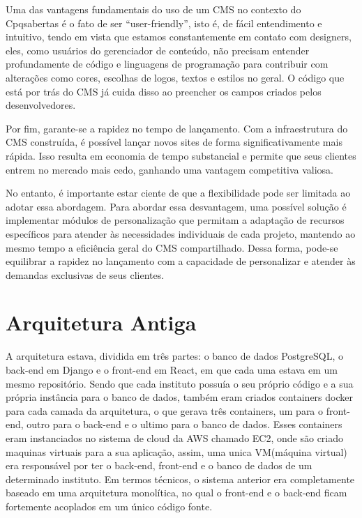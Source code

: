 \documentclass[12pt,twoside,english,brazilian]{article}
\begin{document}
Uma das vantagens fundamentais do uso de um CMS no contexto do Cpqsabertas é o fato de ser “user-friendly”, isto é, de fácil entendimento e intuitivo, tendo em vista que estamos constantemente em contato com designers, eles, como usuários do gerenciador de conteúdo, não precisam entender profundamente de código e linguagens de programação para contribuir com alterações como cores, escolhas de logos, textos e estilos no geral. O código que está por trás do CMS já cuida disso ao preencher os campos criados pelos desenvolvedores.

Por fim, garante-se a rapidez no tempo de lançamento. Com a infraestrutura do CMS construída, é possível lançar novos sites de forma significativamente mais rápida. Isso resulta em economia de tempo substancial e permite que seus clientes entrem no mercado mais cedo, ganhando uma vantagem competitiva valiosa. 

No entanto, é importante estar ciente de que a flexibilidade pode ser limitada ao adotar essa abordagem. Para abordar essa desvantagem, uma possível solução é implementar módulos de personalização que permitam a adaptação de recursos específicos para atender às necessidades individuais de cada projeto, mantendo ao mesmo tempo a eficiência geral do CMS compartilhado. Dessa forma, pode-se equilibrar a rapidez no lançamento com a capacidade de personalizar e atender às demandas exclusivas de seus clientes.

\section{Arquitetura Antiga}

A arquitetura estava, dividida em três partes: o banco de dados PostgreSQL, o back-end em Django e o front-end em React, em que cada uma estava em um mesmo repositório. Sendo que cada instituto possuía o seu próprio código e a sua própria instância para o banco de dados, também eram criados containers docker para cada camada da arquitetura, o que gerava três containers, um para o front-end, outro para o back-end e o ultimo para o banco de dados. Esses containers eram instanciados no sistema de cloud da AWS chamado EC2, onde são criado maquinas virtuais para a sua aplicação, assim, uma unica VM(máquina virtual) era responsável por ter o back-end, front-end e o banco de dados de um determinado instituto. Em termos técnicos, o sistema anterior era completamente baseado em uma arquitetura monolítica, no qual o front-end e o back-end ficam fortemente acoplados em um único código fonte.
\end{document}
